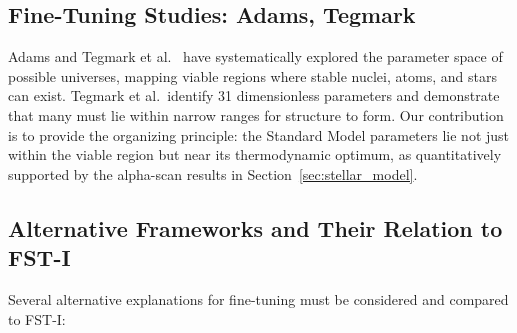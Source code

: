 \documentclass[12pt,a4paper]{article}
\theoremstyle{remark}
\begin{document}
\subsection{Fine-Tuning Studies: Adams, Tegmark}

Adams \citep{Adams2019} and Tegmark et al.\ \citep{Tegmark2006} have systematically explored the parameter space of possible universes, mapping viable regions where stable nuclei, atoms, and stars can exist. Tegmark et al.\ identify 31 dimensionless parameters and demonstrate that many must lie within narrow ranges for structure to form. Our contribution is to provide the organizing principle: the Standard Model parameters lie not just within the viable region but near its thermodynamic optimum, as quantitatively supported by the alpha-scan results in Section~\ref{sec:stellar_model}.

\subsection{Alternative Frameworks and Their Relation to FST-I}

Several alternative explanations for fine-tuning must be considered and compared to FST-I:
\end{document}
